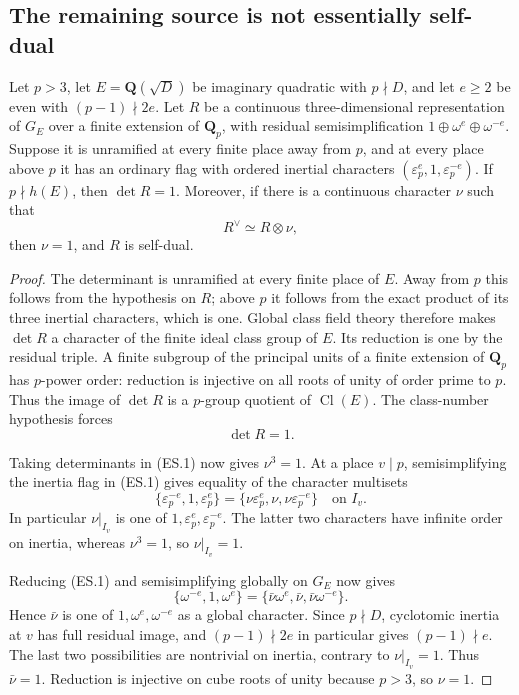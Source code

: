 \subsection{The remaining source is not essentially self-dual}
\label{sec:kt-essential-selfdual-reduction}

\begin{lemma}
Let $p>3$, let $E=\mathbf Q(\sqrt D)$ be imaginary quadratic with
$p\nmid D$, and let $e\ge2$ be even with $(p-1)\nmid2e$.
Let $R$ be a continuous three-dimensional representation of
$G_E$ over a finite extension of $\mathbf Q_p$, with residual
semisimplification $1\oplus\omega^e\oplus\omega^{-e}$.
Suppose it is unramified at every finite place away from $p$,
and at every place above $p$ it has an ordinary flag with
ordered inertial characters
$(\varepsilon_p^e,1,\varepsilon_p^{-e})$.
If $p\nmid h(E)$, then $\det R=1$.
Moreover, if there is a continuous character $\nu$ such that
\[
                          R^\vee\simeq R\otimes\nu,       \tag{ES.1}
\]
then $\nu=1$, and $R$ is self-dual.
\end{lemma}

\begin{proof}
The determinant is unramified at every finite place of $E$.
Away from $p$ this follows from the hypothesis on $R$; above
$p$ it follows from the exact product of its three inertial
characters, which is one.  Global class field theory therefore
makes $\det R$ a character of the finite ideal class group of
$E$.  Its reduction is one by the residual triple.
A finite subgroup of the principal units of a finite extension
of $\mathbf Q_p$ has $p$-power order: reduction is injective
on all roots of unity of order prime to $p$.
Thus the image of $\det R$ is a $p$-group quotient of
$\operatorname{Cl}(E)$.  The class-number hypothesis forces
\[
                              \det R=1.                  \tag{ES.2}
\]

Taking determinants in (ES.1) now gives $\nu^3=1$.
At a place $v\mid p$, semisimplifying the inertia flag in
(ES.1) gives equality of the character multisets
\[
 \{\varepsilon_p^{-e},1,\varepsilon_p^e\}
   =\{\nu\varepsilon_p^e,\nu,\nu\varepsilon_p^{-e}\}
       \quad\text{on }I_v.                               \tag{ES.3}
\]
In particular $\nu|_{I_v}$ is one of
$1,\varepsilon_p^e,\varepsilon_p^{-e}$.
The latter two characters have infinite order on inertia,
whereas $\nu^3=1$, so $\nu|_{I_v}=1$.

Reducing (ES.1) and semisimplifying globally on $G_E$ now
gives
\[
     \{\omega^{-e},1,\omega^e\}
          =\{\bar\nu\omega^e,\bar\nu,
                                      \bar\nu\omega^{-e}\}.
                                                               \tag{ES.4}
\]
Hence $\bar\nu$ is one of $1,\omega^e,\omega^{-e}$ as a
global character.  Since $p\nmid D$, cyclotomic inertia at
$v$ has full residual image, and $(p-1)\nmid2e$ in
particular gives $(p-1)\nmid e$.  The last two possibilities
are nontrivial on inertia, contrary to $\nu|_{I_v}=1$.
Thus $\bar\nu=1$.  Reduction is injective on cube roots
of unity because $p>3$, so $\nu=1$.
\end{proof}


